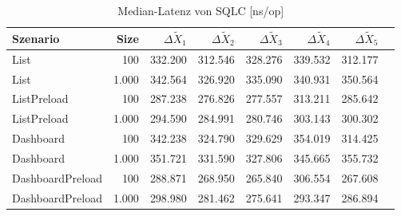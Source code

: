 
\begin{table}[ht]
\setlength{\extrarowheight}{-1pt}
\centering
\caption{Median-Latenz von SQLC [ns/op]}
\begin{tabular}{lrrrrrrr}
\toprule
Szenario & Size & ${\Delta \tilde{X}_1}$ & ${\Delta \tilde{X}_2}$ & ${\Delta \tilde{X}_3}$ & ${\Delta \tilde{X}_4}$ & ${\Delta \tilde{X}_5}$ \\
\midrule
	List & 100 & \cellcolor{red!2}  332.200 & \cellcolor{red!4}  312.546 & \cellcolor{red!1}  328.276 & \cellcolor{red!6}  339.532 & \cellcolor{green!4}  312.177 \\
	List & 1.000 & \cellcolor{red!6}  342.564 & \cellcolor{green!6}  326.920 & \cellcolor{red!5}  335.090 & \cellcolor{red!2}  340.931 & \cellcolor{green!1}  350.564 \\
	ListPreload & 100 & \cellcolor{green!14}  287.238 & \cellcolor{green!12}  276.826 & \cellcolor{green!12}  277.557 & \cellcolor{green!8}  313.211 & \cellcolor{green!15}  285.642 \\
	ListPreload & 1.000 & \cellcolor{green!13}  294.590 & \cellcolor{green!17}  284.991 & \cellcolor{green!15}  280.746 & \cellcolor{green!9}  303.143 & \cellcolor{green!16}  300.302 \\
	Dashboard & 100 & \cellcolor{red!8}  342.238 & \cellcolor{red!6}  324.790 & \cellcolor{red!6}  329.629 & \cellcolor{red!15}  354.019 & \cellcolor{red!2}  314.425 \\
	Dashboard & 1.000 & \cellcolor{red!6}  351.721 & \cellcolor{green!4}  331.590 & \cellcolor{red!4}  327.806 & \cellcolor{red!5}  345.665 & \cellcolor{red!1}  355.732 \\
	DashboardPreload & 100 & \cellcolor{green!11}  288.871 & \cellcolor{green!16}  268.950 & \cellcolor{green!16}  265.840 & \cellcolor{green!7}  306.554 & \cellcolor{green!17}  267.608 \\
	DashboardPreload & 1.000 & \cellcolor{green!12}  298.980 & \cellcolor{green!18}  281.462 & \cellcolor{green!15}  275.641 & \cellcolor{green!11}  293.347 & \cellcolor{green!18}  286.894 \\
\bottomrule
\end{tabular}
\label{tab:latenz_sqlc}
\end{table}
	
